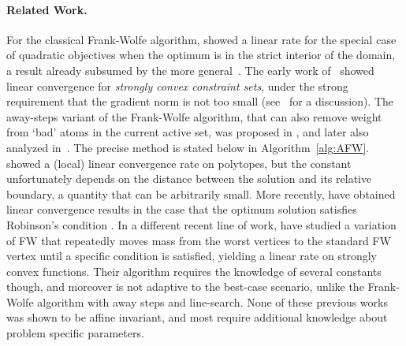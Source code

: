 \documentclass{article} %
\newcommand{\0}{\mathbf{0}} %
\begin{document}
\paragraph{Related Work.}
For the classical Frank-Wolfe algorithm, 
\citep{Beck:2004jm} showed a linear rate for the special case of quadratic
objectives when the optimum is in the strict interior of the domain, 
%
a result already subsumed by the more general~\citep{Guelat:1986fq}.
The early work of~\citep{Levitin:1966gf} %
showed linear convergence for \emph{strongly convex constraint sets},
under the strong requirement that the gradient norm is not too small
(see~\citep{Garber:2015vq} for a discussion).
%
%
%
%
The away-steps variant of the Frank-Wolfe algorithm, that can also remove
weight from `bad' atoms in the current active set, was proposed in
\citep{Wolfe:1970wy}, and later also analyzed in~\citep{Guelat:1986fq}.
The precise method is stated below in Algorithm~\ref{alg:AFW}.
\citep{Guelat:1986fq} showed a (local) linear convergence rate on polytopes,
but the constant unfortunately depends on the
distance between the solution and its relative boundary, a
quantity that can be arbitrarily small.
%
%
More recently, \citep{Ahipasaoglu:2008il,Kumar:2010ku,Nanculef:2014bj} have
obtained linear convergence results in the case that the optimum solution
satisfies Robinson's condition \citep{Robinson:1982ii}.
In a different recent line of work, \citep{Garber:2013vl,%
Lan:2013um} have
studied a variation of FW %
%
that repeatedly moves mass from the worst vertices to the standard FW vertex until
a specific condition is satisfied, yielding a linear rate on strongly convex functions. 
Their algorithm requires the knowledge of several constants though, and
moreover is not adaptive to the best-case scenario, unlike the Frank-Wolfe
algorithm with away steps and line-search. 
None of these previous works was shown to be affine invariant, and most
require additional knowledge about problem specific parameters. %
%

\vspace{-2mm}
\end{document}
